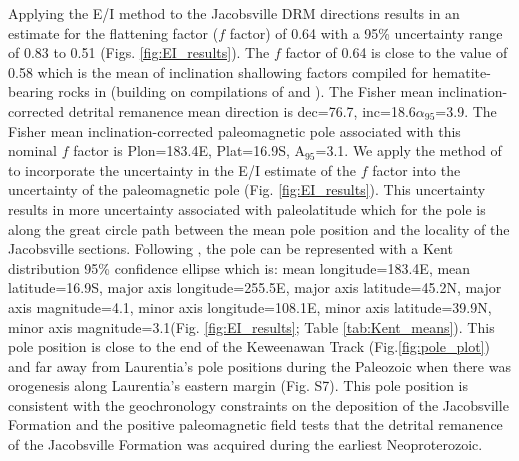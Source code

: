 \documentclass[draft]{agujournal2019}
\begin{document}
Applying the E/I method to the Jacobsville DRM directions results in an estimate for the flattening factor ($f$ factor) of 0.64 with a 95\% uncertainty range of 0.83 to 0.51 (Figs. \ref{fig:EI_results}). The $f$ factor of 0.64 is close to the value of 0.58 which is the mean of inclination shallowing factors compiled for hematite-bearing rocks in  (building on compilations of  and ). The Fisher mean inclination-corrected detrital remanence mean direction is dec=76.7\textdegree, inc=18.6\textdegree $\alpha_{95}$=3.9\textdegree. The Fisher mean inclination-corrected paleomagnetic pole associated with this nominal $f$ factor is Plon=183.4\textdegree E, Plat=16.9\textdegree S, A$_{95}$=3.1\textdegree. We apply the method of  to incorporate the uncertainty in the E/I estimate of the $f$ factor into the uncertainty of the paleomagnetic pole (Fig. \ref{fig:EI_results}). This uncertainty results in more uncertainty associated with paleolatitude which for the pole is along the great circle path between the mean pole position and the locality of the Jacobsville sections. Following , the pole can be represented with a Kent distribution 95\% confidence ellipse which is: mean longitude=183.4\textdegree E, mean latitude=16.9\textdegree S, major axis longitude=255.5\textdegree E, major axis latitude=45.2\textdegree N, major axis magnitude=4.1\textdegree, minor axis longitude=108.1\textdegree E, minor axis latitude=39.9\textdegree N, minor axis magnitude=3.1\textdegree (Fig. \ref{fig:EI_results}; Table \ref{tab:Kent_means}). This pole position is close to the end of the Keweenawan Track (Fig.\ref{fig:pole_plot}) and far away from Laurentia's pole positions during the Paleozoic when there was orogenesis along Laurentia's eastern margin (Fig. S7). This pole position is consistent with the geochronology constraints on the deposition of the Jacobsville Formation and the positive paleomagnetic field tests that the detrital remanence of the Jacobsville Formation was acquired during the earliest Neoproterozoic. 
\end{document}
